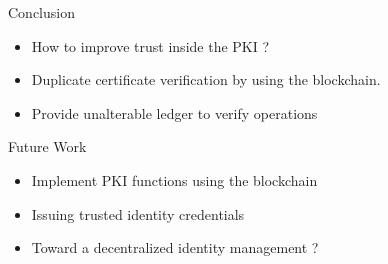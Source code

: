 \begin{frame}{Conclusion}

\begin{itemize}

\item How to improve trust inside the PKI ?

\item Duplicate certificate verification by using the blockchain.

\item Provide unalterable ledger to verify operations

\end{itemize}

\end{frame}

\begin{frame}{Future Work}

\begin{itemize}

\item Implement PKI functions using the blockchain

\item Issuing trusted identity credentials

\item Toward a decentralized identity management ?

\end{itemize}

\end{frame}